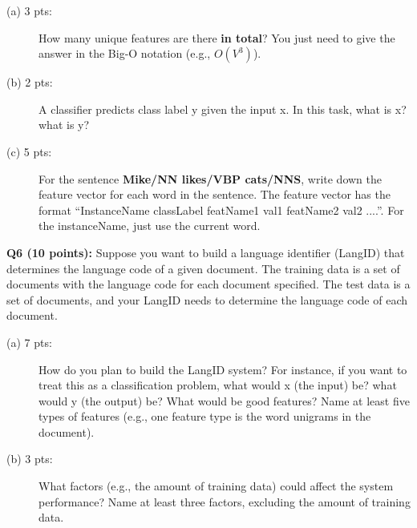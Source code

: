 \documentclass[11pt]{article}
\begin{document}
\begin{description}
\item [(a) 3 pts:] How many unique features are there {\bf in total}?
       You just need to give the answer in the Big-O notation (e.g., $O(V^3)$).

  \item [(b) 2 pts:] A classifier predicts class label y given the input x.
        In this task, what is x? what is y?


  \item [(c) 5 pts:] For the sentence {\bf Mike/NN likes/VBP cats/NNS}, 
  write down the feature vector for each word in the sentence.
  The feature vector has the format 
     ``InstanceName classLabel featName1 val1 featName2 val2 ....''.
     For the instanceName, just use the current word.

\end{description} 




 


\vspace{0.3 in}
\hspace{-0.3in}
       {\bf Q6 (10 points):} Suppose you want to build a language identifier (LangID)
       that determines the language code of a given document.
  The training data is a set of documents with the language code for each
  document specified. The test data is a set of documents, and your LangID
  needs to determine the language code of each document. 

\begin{description}
  \item [(a) 7 pts:] How do you plan to build the LangID system? For instance, 
       if you want to treat this as a classification problem, 
       what would x (the input) be? what would y (the output) be?
       What would be good features? Name at least five types of features
       (e.g., one feature type is the word unigrams in the document).

  \item [(b) 3 pts:] 
          What factors (e.g., the amount of training data) could affect
          the system performance? Name at least three factors, excluding
          the amount of training data.
\end{description}
\end{document}

